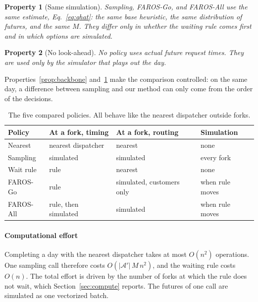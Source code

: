 \documentclass[5p,times,authoryear]{elsarticle}
\newtheorem{property}{Property}
\begin{document}
\begin{property}[Same simulation]\label{prop:estimator}
Sampling, FAROS-Go, and FAROS-All use the same estimate, Eq.~\eqref{eq:qhat}: the same base heuristic, the same distribution of futures, and the same $M$. They differ only in whether the waiting rule comes first and in which options are simulated.
\end{property}

\begin{property}[No look-ahead]\label{prop:nonanticipative}
No policy uses actual future request times. They are used only by the simulator that plays out the day.
\end{property}

Properties~\ref{prop:backbone} and~\ref{prop:estimator} make the comparison controlled: on the same day, a difference between sampling and our method can only come from the order of the decisions.

\begin{table}[t]
\centering
\caption{The five compared policies. All behave like the nearest dispatcher outside forks.}
\label{tab:policies}
\footnotesize
\setlength{\tabcolsep}{3pt}
\begin{tabular}{@{}llll@{}}
\toprule
Policy & At a fork, timing & At a fork, routing & Simulation \\
\midrule
Nearest & nearest dispatcher & nearest & none \\
Sampling & simulated & simulated & every fork \\
Wait rule & rule & nearest & none \\
FAROS-Go & rule & simulated, customers only & when rule moves \\
FAROS-All & rule, then simulated & simulated & when rule moves \\
\bottomrule
\end{tabular}
\end{table}

\paragraph{Computational effort}
Completing a day with the nearest dispatcher takes at most $O(n^2)$ operations. One sampling call therefore costs $O(|\mathcal{A}'|\,M\,n^2)$, and the waiting rule costs $O(n)$. The total effort is driven by the number of forks at which the rule does not wait, which Section~\ref{sec:compute} reports. The futures of one call are simulated as one vectorized batch.
\end{document}
